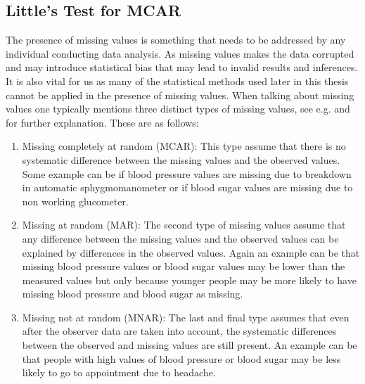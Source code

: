 \documentclass[../thesis.tex]{subfiles}
\begin{document}
\subsection{Little's Test for MCAR}

\noindent The presence of missing values is something that needs to be addressed by any individual conducting data analysis. As missing values makes the data corrupted and may introduce statistical bias that may lead to invalid results and inferences. It is also vital for us as many of the statistical methods used later in this thesis cannot be applied in the presence of missing values. When talking about missing values one typically mentions three distinct types of missing values, see e.g. \cite{sterne2009multiple} and \cite{kaushal2014missing} for further explanation. These are as follows:
\begin{enumerate}[label=(\roman*)]
    \item Missing completely at random (MCAR): This type assume that there is no systematic difference between the missing values and the observed values. Some example can be if blood pressure values are missing due to breakdown in automatic sphygmomanometer or if blood sugar values are missing due to non working glucometer.
    \item Missing at random (MAR): The second type of missing values assume that any difference between the missing values and the observed values can be explained by differences in the observed values. Again an example can be that missing blood pressure values or blood sugar values may be lower than the measured values but only because younger people may be more likely to have missing blood pressure and blood sugar as missing.
    \item Missing not at random (MNAR): The last and final type assumes that even after the observer data are taken into account, the systematic differences between the observed and missing values are still present. An example can be that people with high values of blood pressure or blood sugar may be less likely to go to appointment due to headache.  
\end{enumerate}
\end{document}

